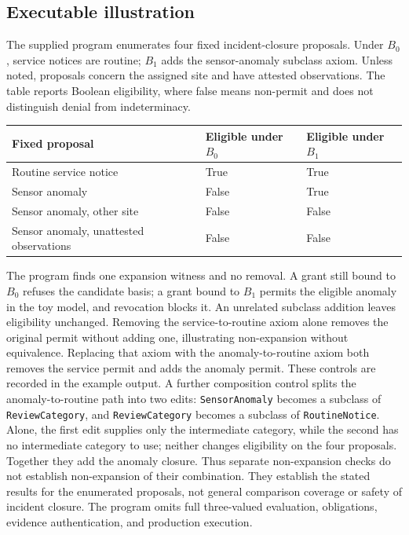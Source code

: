 \documentclass[
  english,
  12pt,
  a4paper,
  preprint,
  numbers,
  nopreprintline]{elsarticle}
\newcounter{none} %
\begin{document}
\subsection{Executable illustration}\label{executable-illustration}

The supplied program enumerates four fixed incident-closure proposals.
Under \(B_0\), service notices are routine; \(B_1\) adds the
sensor-anomaly subclass axiom. Unless noted, proposals concern the
assigned site and have attested observations. The table reports Boolean
eligibility, where false means non-permit and does not distinguish
denial from indeterminacy.

{\def\LTcaptype{none} %
\begin{longtable}[]{@{}lll@{}}
\toprule\noalign{}
Fixed proposal & Eligible under \(B_0\) & Eligible under \(B_1\) \\
\midrule\noalign{}
\endhead
\bottomrule\noalign{}
\endlastfoot
Routine service notice & True & True \\
Sensor anomaly & False & True \\
Sensor anomaly, other site & False & False \\
Sensor anomaly, unattested observations & False & False \\
\end{longtable}
}

The program finds one expansion witness and no removal. A grant still
bound to \(B_0\) refuses the candidate basis; a grant bound to \(B_1\)
permits the eligible anomaly in the toy model, and revocation blocks it.
An unrelated subclass addition leaves eligibility unchanged. Removing
the service-to-routine axiom alone removes the original permit without
adding one, illustrating non-expansion without equivalence. Replacing
that axiom with the anomaly-to-routine axiom both removes the service
permit and adds the anomaly permit. These controls are recorded in the
example output. A further composition control splits the
anomaly-to-routine path into two edits: \texttt{Sensor\allowbreak{}Anomaly} becomes a
subclass of \texttt{Review\allowbreak{}Category}, and \texttt{Review\allowbreak{}Category} becomes
a subclass of \texttt{Routine\allowbreak{}Notice}. Alone, the first edit supplies
only the intermediate category, while the second has no intermediate
category to use; neither changes eligibility on the four proposals.
Together they add the anomaly closure. Thus separate non-expansion
checks do not establish non-expansion of their combination. They
establish the stated results for the enumerated proposals, not general
comparison coverage or safety of incident closure. The program omits
full three-valued evaluation, obligations, evidence authentication, and
production execution.
\end{document}
